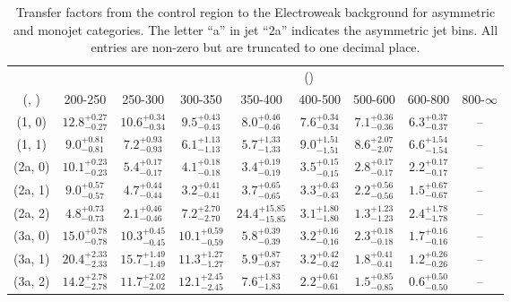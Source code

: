 \begin{table}[h!]
\tiny
\centering
\caption{Transfer factors from the \mmj control region to the Electroweak background for asymmetric and monojet categories. The letter ``a'' in jet \eg ``2a''  indicates the asymmetric jet bins. All entries are non-zero but are truncated to one decimal place.\label{tab:tf_mumu_total_asym}}
\begin{tabular}
{ccccccccc}
	\hline\hline
&	& \multicolumn{8}{c}{\scalht (\gev)} \\ 
	 (\njet,  \nb) & 200-250 & 250-300 & 300-350 & 350-400 & 400-500 & 500-600 & 600-800 & 800-$\infty$ \\ [0.8ex] 
\hline
	(1, 0) & $12.8^{+ 0.27 }_{- 0.27 }$ & $10.6^{+ 0.34 }_{- 0.34 }$ & $9.5^{+ 0.43 }_{- 0.43 }$ & $8.0^{+ 0.46 }_{- 0.46 }$ & $7.6^{+ 0.34 }_{- 0.34 }$ & $7.1^{+ 0.36 }_{- 0.36 }$ & $6.3^{+ 0.37 }_{- 0.37 }$ & -- \\[0.5ex] 
	(1, 1) & $9.0^{+ 0.81 }_{- 0.81 }$ & $7.2^{+ 0.93 }_{- 0.93 }$ & $6.1^{+ 1.13 }_{- 1.13 }$ & $5.7^{+ 1.33 }_{- 1.33 }$ & $9.0^{+ 1.51 }_{- 1.51 }$ & $8.6^{+ 2.07 }_{- 2.07 }$ & $6.6^{+ 1.54 }_{- 1.54 }$ & -- \\[0.5ex] 
	(2a, 0) & $10.1^{+ 0.23 }_{- 0.23 }$ & $5.4^{+ 0.17 }_{- 0.17 }$ & $4.1^{+ 0.18 }_{- 0.18 }$ & $3.4^{+ 0.19 }_{- 0.19 }$ & $3.5^{+ 0.15 }_{- 0.15 }$ & $2.8^{+ 0.17 }_{- 0.17 }$ & $2.2^{+ 0.17 }_{- 0.17 }$ & -- \\[0.5ex] 
	(2a, 1) & $9.0^{+ 0.57 }_{- 0.57 }$ & $4.7^{+ 0.44 }_{- 0.44 }$ & $3.2^{+ 0.41 }_{- 0.41 }$ & $3.7^{+ 0.65 }_{- 0.65 }$ & $3.3^{+ 0.43 }_{- 0.43 }$ & $2.2^{+ 0.56 }_{- 0.56 }$ & $1.5^{+ 0.67 }_{- 0.67 }$ & -- \\[0.5ex] 
	(2a, 2) & $4.8^{+ 0.73 }_{- 0.73 }$ & $2.1^{+ 0.46 }_{- 0.46 }$ & $7.2^{+ 2.70 }_{- 2.70 }$ & $24.4^{+ 15.85 }_{- 15.85 }$ & $3.1^{+ 1.80 }_{- 1.80 }$ & $1.3^{+ 1.23 }_{- 1.23 }$ & $2.4^{+ 1.78 }_{- 1.78 }$ & -- \\[0.5ex] 
	(3a, 0) & $15.0^{+ 0.78 }_{- 0.78 }$ & $10.3^{+ 0.45 }_{- 0.45 }$ & $10.1^{+ 0.59 }_{- 0.59 }$ & $5.8^{+ 0.39 }_{- 0.39 }$ & $3.2^{+ 0.16 }_{- 0.16 }$ & $2.3^{+ 0.18 }_{- 0.18 }$ & $1.7^{+ 0.16 }_{- 0.16 }$ & -- \\[0.5ex] 
	(3a, 1) & $20.4^{+ 2.33 }_{- 2.33 }$ & $15.7^{+ 1.49 }_{- 1.49 }$ & $11.3^{+ 1.27 }_{- 1.27 }$ & $5.9^{+ 0.87 }_{- 0.87 }$ & $3.2^{+ 0.42 }_{- 0.42 }$ & $1.8^{+ 0.41 }_{- 0.41 }$ & $1.2^{+ 0.26 }_{- 0.26 }$ & -- \\[0.5ex] 
	(3a, 2) & $14.2^{+ 2.78 }_{- 2.78 }$ & $11.7^{+ 2.02 }_{- 2.02 }$ & $12.1^{+ 2.45 }_{- 2.45 }$ & $7.6^{+ 1.83 }_{- 1.83 }$ & $2.2^{+ 0.61 }_{- 0.61 }$ & $1.5^{+ 0.85 }_{- 0.85 }$ & $0.6^{+ 0.50 }_{- 0.50 }$ & -- \\[0.5ex] 

\end{tabular}
\end{table}
